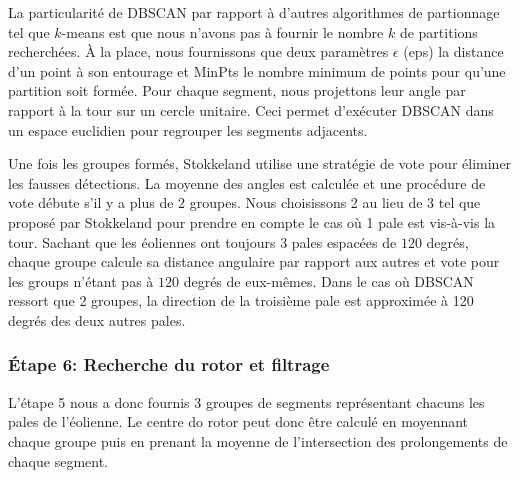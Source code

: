 La particularité de DBSCAN par rapport à d'autres algorithmes de partionnage tel que $k$-means est que nous n'avons pas à fournir le nombre $k$ de partitions recherchées. À la place, nous fournissons que deux paramètres $\epsilon$ (eps) la distance d'un point à son entourage et MinPts le nombre minimum de points pour qu'une partition soit formée. Pour chaque segment, nous projettons leur angle par rapport à la tour sur un cercle unitaire. Ceci permet d'exécuter DBSCAN dans un espace euclidien pour regrouper les segments adjacents.

Une fois les groupes formés, Stokkeland utilise une stratégie de vote pour éliminer les fausses détections. La moyenne des angles est calculée et une procédure de vote débute s'il y a plus de 2 groupes. Nous choisissons 2 au lieu de 3 tel que proposé par Stokkeland pour prendre en compte le cas où 1 pale est vis-à-vis la tour. Sachant que les éoliennes ont toujours 3 pales espacées de $120$ degrés, chaque groupe calcule sa distance angulaire par rapport aux autres et vote pour les groups n'étant pas à $120$ degrés de eux-mêmes. Dans le cas où DBSCAN ressort que 2 groupes, la direction de la troisième pale est approximée à 120 degrés des deux autres pales.

\subsubsection{Étape 6: Recherche du rotor et filtrage}

L'étape 5 nous a donc fournis 3 groupes de segments représentant chacuns les pales de l'éolienne. Le centre do rotor peut donc être calculé en moyennant chaque groupe puis en prenant la moyenne de l'intersection des prolongements de chaque segment.

